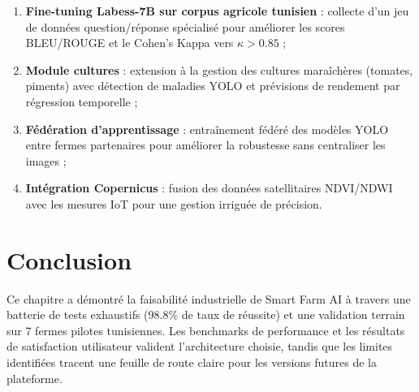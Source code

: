 \begin{enumerate}
  \item \textbf{Fine-tuning Labess-7B sur corpus agricole tunisien} :
        collecte d'un jeu de données question/réponse spécialisé pour
        améliorer les scores BLEU/ROUGE et le Cohen's Kappa vers $\kappa > 0.85$ ;
  \item \textbf{Module cultures} : extension à la gestion des cultures
        maraîchères (tomates, piments) avec détection de maladies YOLO et
        prévisions de rendement par régression temporelle ;
  \item \textbf{Fédération d'apprentissage} : entraînement fédéré des modèles
        YOLO entre fermes partenaires pour améliorer la robustesse sans
        centraliser les images ;
  \item \textbf{Intégration Copernicus} : fusion des données satellitaires
        NDVI/NDWI avec les mesures IoT pour une gestion irriguée de précision.
\end{enumerate}

\section*{Conclusion}
Ce chapitre a démontré la faisabilité industrielle de Smart Farm AI à travers
une batterie de tests exhaustifs (98.8\% de taux de réussite) et une validation
terrain sur 7 fermes pilotes tunisiennes. Les benchmarks de performance et
les résultats de satisfaction utilisateur valident l'architecture choisie,
tandis que les limites identifiées tracent une feuille de route claire pour
les versions futures de la plateforme.

